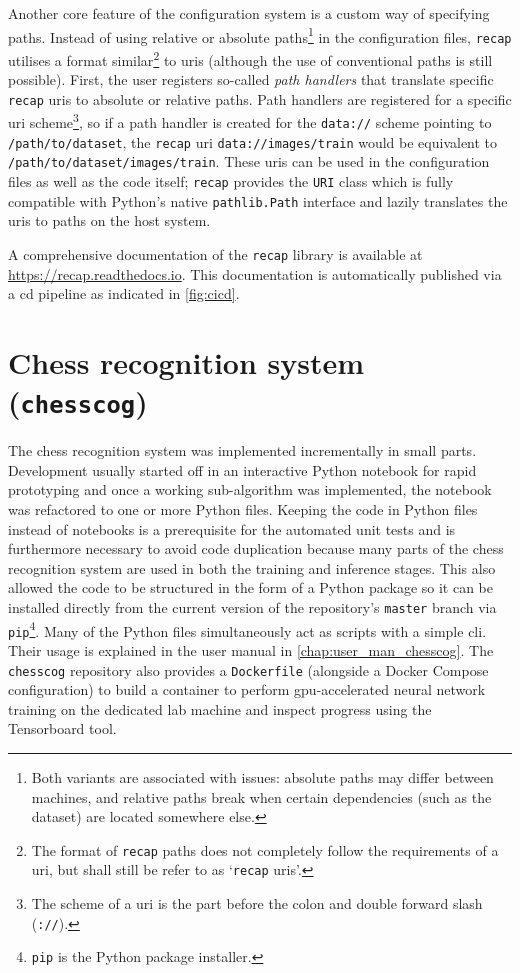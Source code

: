 \documentclass[../report.tex]{subfiles}
\begin{document}
Another core feature of the configuration system is a custom way of specifying paths.
Instead of using relative or absolute paths\footnote{Both variants are associated with issues: absolute paths may differ between machines, and relative paths break when certain dependencies (such as the dataset) are located somewhere else.} in the configuration files, \texttt{recap} utilises a format similar\footnote{The format of \texttt{recap} paths does not completely follow the requirements of a \gls{uri}, but shall still be refer to as `\texttt{recap} \glspl{uri}'.} to \glspl{uri} (although the use of conventional paths is still possible).
First, the user registers so-called \emph{path handlers} that translate specific \texttt{recap} \glspl{uri} to absolute or relative paths.
Path handlers are registered for a specific \gls{uri} scheme\footnote{The scheme of a \gls{uri} is the part before the colon and double forward slash (\texttt{://}).}, so if a path handler is created for the \texttt{data://} scheme pointing to \texttt{/path/to/dataset}, the \texttt{recap} \gls{uri} \texttt{data://images/train} would be equivalent to \texttt{/path/to/dataset/images/train}.
These \glspl{uri} can be used in the configuration files as well as the code itself; 
\texttt{recap} provides the \texttt{URI} class which is fully compatible with Python's native \texttt{pathlib.Path} interface and lazily translates the \glspl{uri} to paths on the host system.

A comprehensive documentation of the \texttt{recap} library is available at \url{https://recap.readthedocs.io}.
This documentation is automatically published via a \gls{cd} pipeline as indicated in \cref{fig:cicd}.

\section{Chess recognition system (\texttt{chesscog})}
The chess recognition system was implemented incrementally in small parts. 
Development usually started off in an interactive Python notebook for rapid prototyping and once a working sub-algorithm was implemented, the notebook was refactored to one or more Python files.
Keeping the code in Python files instead of notebooks is a prerequisite for the automated unit tests and is furthermore necessary to avoid code duplication because many parts of the chess recognition system are used in both the training and inference stages.
This also allowed the code to be structured in the form of a Python package so it can be installed directly from the current version of the repository's \texttt{master} branch via \texttt{pip}\footnote{\texttt{pip} is the Python package installer.}.
Many of the Python files simultaneously act as scripts with a simple \gls{cli}.
Their usage is explained in the user manual in \cref{chap:user_man_chesscog}.
The \texttt{chesscog} repository also provides a \texttt{Dockerfile} (alongside a Docker Compose configuration) to build a container to perform \gls{gpu}-accelerated neural network training on the dedicated lab machine and inspect progress using the Tensorboard tool.
\end{document}
